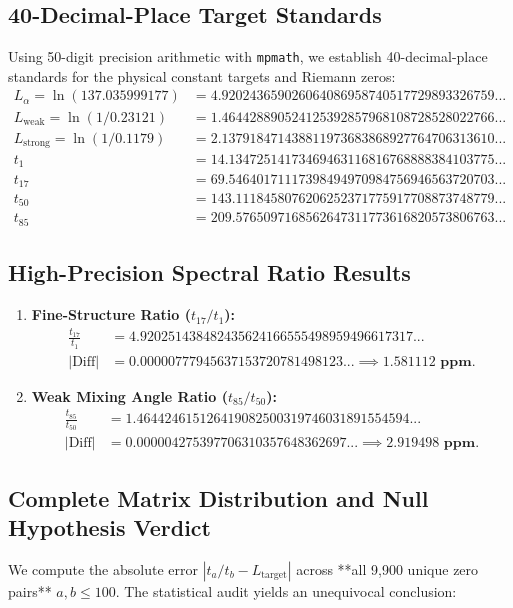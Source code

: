 \documentclass[11pt,a4paper]{article}
\begin{document}
\subsection{40-Decimal-Place Target Standards}
Using 50-digit precision arithmetic with \texttt{mpmath}, we establish 40-decimal-place standards for the physical constant targets and Riemann zeros:
\begin{align}
L_\alpha = \ln(137.035999177) &= \mathbf{4.920243659026064086958740517729893326759...} \\
L_{\text{weak}} = \ln(1/0.23121) &= \mathbf{1.464428890524125392857968108728528022766...} \\
L_{\text{strong}} = \ln(1/0.1179) &= \mathbf{2.137918471438811973683868927764706313610...} \\
t_1 &= \mathbf{14.13472514173469463116816768888384103775...} \\
t_{17} &= \mathbf{69.54640171117398494970984756946563720703...} \\
t_{50} &= \mathbf{143.1118458076206252371775917708873748779...} \\
t_{85} &= \mathbf{209.5765097168562647311773616820573806763...}
\end{align}

\subsection{High-Precision Spectral Ratio Results}
\begin{enumerate}
    \item \textbf{Fine-Structure Ratio ($t_{17} / t_1$):}
    \begin{align}
    \frac{t_{17}}{t_1} &= \mathbf{4.920251438482435624166555498959496617317...} \\
    | \text{Diff} | &= \mathbf{0.00000777945637153720781498123...} \implies \mathbf{1.581112 \text{ ppm}}.
    \end{align}
    \item \textbf{Weak Mixing Angle Ratio ($t_{85} / t_{50}$):}
    \begin{align}
    \frac{t_{85}}{t_{50}} &= \mathbf{1.464424615126419082500319746031891554594...} \\
    | \text{Diff} | &= \mathbf{0.000004275397706310357648362697...} \implies \mathbf{2.919498 \text{ ppm}}.
    \end{align}
\end{enumerate}

\subsection{Complete Matrix Distribution and Null Hypothesis Verdict}
We compute the absolute error $| t_a / t_b - L_{\text{target}} |$ across **all 9,900 unique zero pairs** $a, b \le 100$. The statistical audit yields an unequivocal conclusion:
\end{document}
